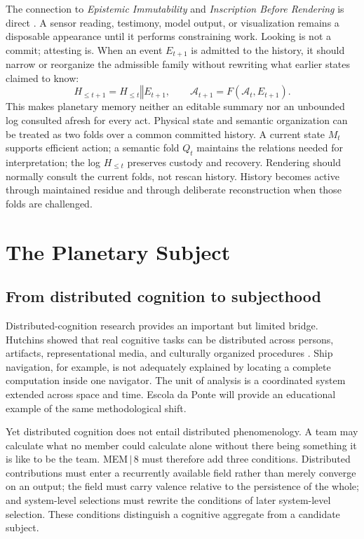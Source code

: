\documentclass[11pt]{article}
\begin{document}
The connection to \emph{Epistemic Immutability} and \emph{Inscription Before Rendering} is direct \cite{flyxionEI,flyxionIR}. A sensor reading, testimony, model output, or visualization remains a disposable appearance until it performs constraining work. Looking is not a commit; attesting is. When an event $E_{t+1}$ is admitted to the history, it should narrow or reorganize the admissible family without rewriting what earlier states claimed to know:
\[
H_{\leq t+1}=H_{\leq t}\mathbin{\Vert}E_{t+1},
\qquad
\mathcal{A}_{t+1}=F(\mathcal{A}_t,E_{t+1}).
\]
This makes planetary memory neither an editable summary nor an unbounded log consulted afresh for every act. Physical state and semantic organization can be treated as two folds over a common committed history. A current state $M_t$ supports efficient action; a semantic fold $Q_t$ maintains the relations needed for interpretation; the log $H_{\leq t}$ preserves custody and recovery. Rendering should normally consult the current folds, not rescan history. History becomes active through maintained residue and through deliberate reconstruction when those folds are challenged.

\section{The Planetary Subject}

\subsection{From distributed cognition to subjecthood}

Distributed-cognition research provides an important but limited bridge. Hutchins showed that real cognitive tasks can be distributed across persons, artifacts, representational media, and culturally organized procedures \cite{hutchins1995,hutchins2001}. Ship navigation, for example, is not adequately explained by locating a complete computation inside one navigator. The unit of analysis is a coordinated system extended across space and time. Escola da Ponte will provide an educational example of the same methodological shift.

Yet distributed cognition does not entail distributed phenomenology. A team may calculate what no member could calculate alone without there being something it is like to be the team. MEM\,$|$\,8 must therefore add three conditions. Distributed contributions must enter a recurrently available field rather than merely converge on an output; the field must carry valence relative to the persistence of the whole; and system-level selections must rewrite the conditions of later system-level selection. These conditions distinguish a cognitive aggregate from a candidate subject.
\end{document}
